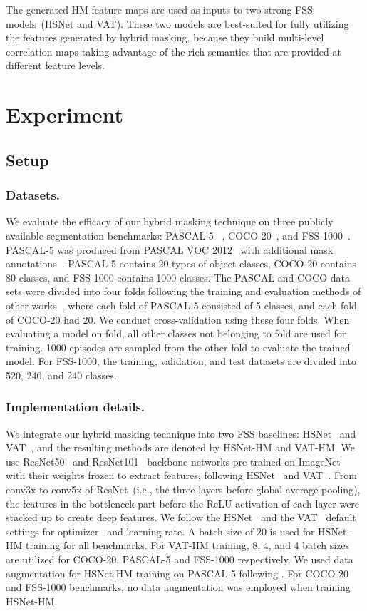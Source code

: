 \documentclass[runningheads]{llncs}
\begin{document}
The generated HM feature maps are used as inputs to two strong FSS models~(HSNet and VAT). These two models are best-suited for fully utilizing the features generated by hybrid masking, because they build multi-level correlation maps taking advantage of the rich semantics that are provided at different feature levels.







\section{Experiment}
\subsection{Setup}
\subsubsection{Datasets.}
We evaluate the efficacy of our hybrid masking technique on three publicly available segmentation benchmarks: PASCAL-5~\cite{OSLSM} , COCO-20~\cite{lin2015microsoft}, and FSS-1000~\cite{FSS1000}. PASCAL-5 was produced from PASCAL VOC 2012~\cite{pascal} with additional mask annotations~\cite{pascal_2}. PASCAL-5 contains 20 types of object classes, COCO-20 contains 80 classes, and FSS-1000 contains 1000 classes. The PASCAL and COCO data sets were divided into four folds following the training and evaluation methods of other works~\cite{PPNet,FWB,PFENet,DAN,PMM, HSNet, VAT, ASNet}, where each fold of PASCAL-5 consisted of 5 classes, and each fold of COCO-20 had 20. We conduct cross-validation using these four folds. When evaluating a model on fold, all other classes not belonging to fold are used for training. 1000 episodes are sampled from the other  fold to evaluate the trained model. For FSS-1000, the training, validation, and test datasets are divided into 520, 240, and 240 classes.

\subsubsection{Implementation details.} We integrate our hybrid masking technique into two FSS baselines: HSNet~\cite{HSNet} and VAT~\cite{VAT}, and the resulting methods are denoted by HSNet-HM and VAT-HM.
We use ResNet50~\cite{Resnet} and ResNet101~\cite{Resnet} backbone networks pre-trained on ImageNet~\cite{image_net} with their weights frozen to extract features, following HSNet~\cite{HSNet} and VAT~\cite{VAT}. From conv3x to conv5x of ResNet~(i.e., the three layers before global average pooling), the features in the bottleneck part before the ReLU activation of each layer were stacked up to create deep features. We follow the HSNet~\cite{HSNet} and the VAT~\cite{VAT} default settings for optimizer~\cite{Adam} and learning rate. A batch size of 20 is used for HSNet-HM training for all benchmarks. For VAT-HM training, 8, 4, and 4 batch sizes are utilized for COCO-20, PASCAL-5 and FSS-1000 respectively. 
We used data augmentation for HSNet-HM training on PASCAL-5 following \cite{data_aug_1, data_gug_2, VAT}. For COCO-20 and FSS-1000 benchmarks, no data augmentation was employed when training HSNet-HM. 
\end{document}
